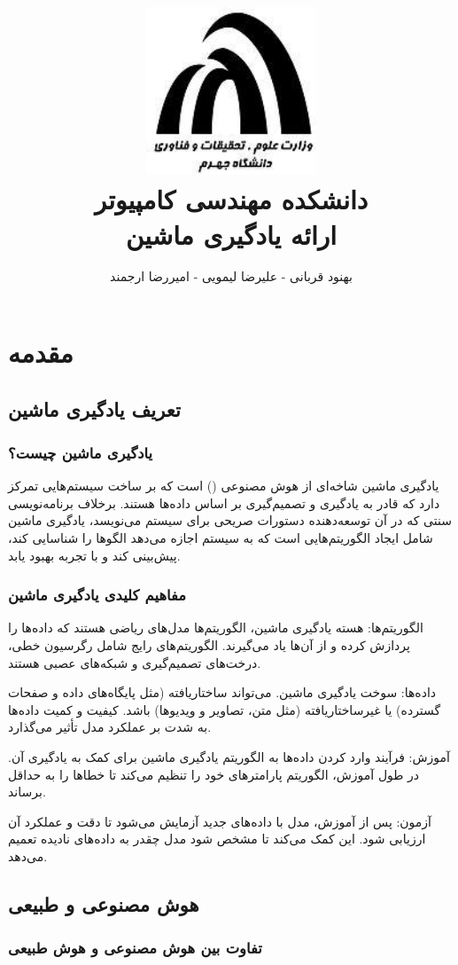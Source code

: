 \documentclass[a4paper, titlepage]{article}
\title{
    \center
    \includegraphics[height=5cm]{logo.jpg} \\
    دانشکده مهندسی کامپیوتر \\[25pt]     
    ارائه یادگیری ماشین
}
\author{
     بهنود قربانی - علیرضا لیمویی - امیررضا ارجمند
}
\date{}
\begin{document}
\maketitle
\tableofcontents


\section{مقدمه}

\subsection{تعریف یادگیری ماشین}
\subsubsection{یادگیری ماشین چیست؟}

یادگیری ماشین شاخه‌ای از هوش مصنوعی () است که بر ساخت سیستم‌هایی تمرکز دارد که قادر به یادگیری و تصمیم‌گیری بر اساس داده‌ها هستند. برخلاف برنامه‌نویسی سنتی که در آن توسعه‌دهنده دستورات صریحی برای سیستم می‌نویسد، یادگیری ماشین شامل ایجاد الگوریتم‌هایی است که به سیستم اجازه می‌دهد الگوها را شناسایی کند، پیش‌بینی کند و با تجربه بهبود یابد.

\subsubsection{مفاهیم کلیدی یادگیری ماشین}

الگوریتم‌ها: هسته یادگیری ماشین، الگوریتم‌ها مدل‌های ریاضی هستند که داده‌ها را پردازش کرده و از آن‌ها یاد می‌گیرند. الگوریتم‌های رایج شامل رگرسیون خطی، درخت‌های تصمیم‌گیری و شبکه‌های عصبی هستند.

داده‌ها: سوخت یادگیری ماشین. می‌تواند ساختاریافته (مثل پایگاه‌های داده و صفحات گسترده) یا غیرساختاریافته (مثل متن، تصاویر و ویدیوها) باشد. کیفیت و کمیت داده‌ها به شدت بر عملکرد مدل تأثیر می‌گذارد.

آموزش: فرآیند وارد کردن داده‌ها به الگوریتم یادگیری ماشین برای کمک به یادگیری آن. در طول آموزش، الگوریتم پارامترهای خود را تنظیم می‌کند تا خطاها را به حداقل برساند.

آزمون: پس از آموزش، مدل با داده‌های جدید آزمایش می‌شود تا دقت و عملکرد آن ارزیابی شود. این کمک می‌کند تا مشخص شود مدل چقدر به داده‌های نادیده تعمیم می‌دهد.
\subsection{هوش مصنوعی و طبیعی}
\subsubsection{تفاوت بین هوش مصنوعی و هوش طبیعی}
\end{document}
